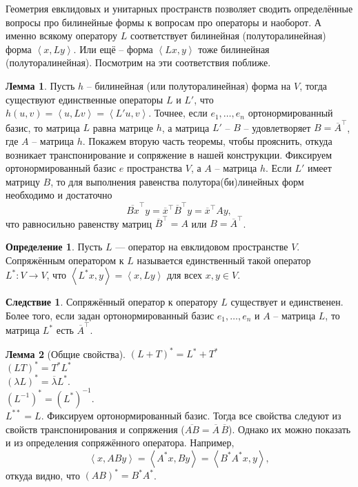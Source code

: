 \documentclass[10pt,a4paper,oneside]{book} %
\theoremstyle{definition}
\newtheorem*{defn}{Определение}
\newtheorem{lem}{Лемма}
\newtheorem{cor}{Следствие}
\newcommand{\ovl}{\overline}
\def\lan{\left\langle }
\def\ran{\right\rangle}
\def\dfn{\begin{defn}}
\def\edfn{\end{defn}}
\def\lm{\begin{lem}}
\def\elm{\end{lem}}
\def\crl{\begin{cor}}
\def\ecrl{\end{cor}}
\begin{document}
Геометрия евклидовых и унитарных пространств позволяет сводить определённые вопросы про билинейные формы к вопросам про операторы и наоборот. А именно всякому оператору $L$ соответствует билинейная (полуторалинейная) форма $\lan x,Ly\ran$. Или ещё -- форма $\lan Lx,y\ran$ тоже билинейная (полуторалинейная). Посмотрим на эти соответствия поближе.

\lm Пусть $h$ -- билинейная (или полуторалинейная) форма на $V$, тогда существуют единственные операторы $L$ и $L'$, что $h(u,v) = \lan u,Lv \ran= \lan L'u,v\ran $. Точнее, если $e_1,\dots,e_n$ ортонормированный базис, то матрица $L$ равна матрице $h$, а матрица $L'$ -- $B$ -- удовлетворяет $B=\ovl{A}^{\top}$, где $A$ -- матрица $h$. 
\proof Покажем вторую часть теоремы, чтобы прояснить, откуда возникает транспонирование и сопряжение в нашей конструкции. Фиксируем ортонормированный базис $e$ пространства $V$, а $A$ -- матрица $h$. Если $L'$ имеет матрицу $B$, то для выполнения равенства полутора(би)линейных форм необходимо и достаточно  $$\ovl{Bx}^{\top}y=\ovl{x}^{\top}\ovl{B}^{\top}y=\ovl{x}^{\top}Ay,$$ 
что равносильно равенству матриц $\ovl{B}^{\top}=A$ или $B=\ovl{A}^{\top}$.
\endproof
\elm

\dfn Пусть $L$ --- оператор на евклидовом пространстве $V$. Сопряжённым оператором к $L$ называется единственный такой оператор $L^*\colon V \to V$, что $\lan L^*x,y\ran=\lan x,Ly \ran$ для всех $x,y \in V$.
\edfn

\crl Сопряжённый оператор к оператору $L$ существует и единственен. Более того, если задан ортонормированный базис $e_1,\dots,e_n$ и $A$ -- матрица $L$, то матрица $L^*$ есть $\ovl{A}^{\top}$.
\ecrl









\lm[Общие свойства]
$(L+T)^*=L^*+T^*$\\
$(LT)^*=T^*L^*$\\
$(\lambda L)^*=\ovl{\lambda}L^*$.\\
$(L^{-1})^*=(L^*)^{-1}$.\\
$L^{**}=L$.
\proof Фиксируем ортонормированный базис. Тогда все свойства следуют из свойств транспонирования и сопряжения ($\ovl{AB} = \ovl{ A} \,\ovl{B}$).
Однако их можно показать и из определения сопряжённого оператора. Например,
$$\lan x, ABy\ran = \lan A^*x, By\ran = \lan B^*A^*x,y\ran,$$
откуда видно, что $(AB)^*=B^* A^*$. 
\endproof
\elm
\end{document}
